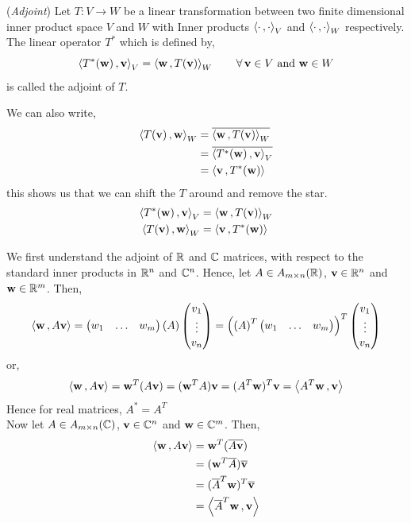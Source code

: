 \documentclass{article}
\begin{document}
\begin{ndefi}{(\textit{Adjoint})}
  Let $T : V \to W$ be a linear transformation between two finite dimensional inner product space $V$ and $W$ with Inner products $\ip{\cdot}{\cdot}_V$ and $\ip{\cdot}{\cdot}_W$ respectively. The linear operator $T^*$ which is defined by,
  $$ \ip{T^*(\vec w)}{\vec v}_V = \ip{\vec w}{T(\vec v)}_W \qquad \fa\vec v\in V \text{ and } \vec w\in W$$
  is called the adjoint of $T$.
\end{ndefi}

We can also write,
\begin{align*}
  \ip{T(\vec v)}{\vec w}_W &= \overline{\ip{\vec w}{T(\vec v)}_W}\\
  &= \overline{\ip{T^*(\vec w)}{\vec v}_V}\\
  &= \ip{\vec v}{T^*(\vec w)}
\end{align*}
this shows us that we can shift the $T$ around and remove the star.
\begin{align*}
  \ip{T^*(\vec w)}{\vec v}_V &= \ip{\vec w}{T(\vec v)}_W\\
  \ip{T(\vec v)}{\vec w}_W &= \ip{\vec v}{T^*(\vec w)}\\
\end{align*}

We first understand the adjoint of $\R$ and $\C$ matrices, with respect to the standard inner products in $\R^n$ and $\C^n$. Hence, let $A \in A_{m\times n}(\R)$, $\vec v \in \R^n$ and $\vec w\in \R^m$. Then,
$$ \ip{\vec w}{A\vec v} = \begin{pmatrix}
  w_1 & \dots & w_m
\end{pmatrix} \left( A \right) \begin{pmatrix}
  v_1 \\ \vdots \\ v_n
\end{pmatrix} =
\left(\left( A \right)^T\begin{pmatrix}
  w_1 & \dots & w_m
\end{pmatrix} \right)^T \begin{pmatrix}
  v_1 \\ \vdots \\ v_n
\end{pmatrix}
$$
or,
$$ \ip{\vec w}{A\vec v} = \vec w^T(A\vec v) = (\vec w^TA)\vec v = (A^T\vec w)^T\vec v = \ip{A^T\vec w}{\vec v} $$
Hence for real matrices, $A^* = A^T$\\

Now let $A \in A_{m\times n}(\C)$, $\vec v \in \C^n$ and $\vec w\in \C^m$. Then,
\begin{align*}
  \ip{\vec w}{A\vec v} &= \vec w^T(\overline{A\vec v})\\
  &= (\vec w^T\overline{A})\overline{\vec v}\\
  &= (\overline{A}^T\vec w)^T\overline{\vec v}\\
  &= \ip{\overline{A}^T\vec w}{\vec v}
\end{align*}
\end{document}
